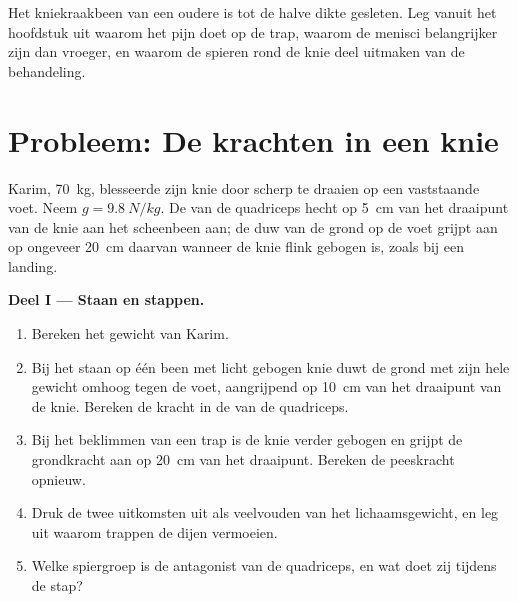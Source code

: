 \begin{exercise}[$\star\star\star$]\label{exo:g10:muscles-and-joints:15}
Het kniekraakbeen van een oudere is tot de halve dikte gesleten. Leg
vanuit het hoofdstuk uit waarom het  pijn doet op de trap,
waarom de menisci belangrijker zijn dan vroeger, en waarom de spieren
rond de knie deel uitmaken van de behandeling.
\end{exercise}

\section{Probleem: De krachten in een knie}

\begin{problem}
\label{pb:g10:muscles-and-joints:1}
Karim, \qty{70}{kg}, blesseerde zijn knie door scherp te draaien op een
vaststaande voet. Neem $g = \qty{9.8}{N/kg}$. De  van de quadriceps
hecht op \qty{5}{cm} van het draaipunt van de knie aan het scheenbeen
aan; de duw van de grond op de voet grijpt aan op ongeveer \qty{20}{cm}
daarvan wanneer de knie flink gebogen is, zoals bij een landing.

\medskip
\noindent\textbf{Deel I --- Staan en stappen.}
\begin{enumerate}
  \item Bereken het gewicht van Karim.
  \item Bij het staan op één been met licht gebogen knie duwt de grond
        met zijn hele gewicht omhoog tegen de voet, aangrijpend op
        \qty{10}{cm} van het draaipunt van de knie. Bereken de kracht in
        de  van de quadriceps.
  \item Bij het beklimmen van een trap is de knie verder gebogen en
        grijpt de grondkracht aan op \qty{20}{cm} van het draaipunt.
        Bereken de peeskracht opnieuw.
  \item Druk de twee uitkomsten uit als veelvouden van het
        lichaamsgewicht, en leg uit waarom trappen de dijen vermoeien.
  \item Welke spiergroep is de antagonist van de quadriceps, en wat doet
        zij tijdens de stap?
\end{enumerate}


\end{problem}
